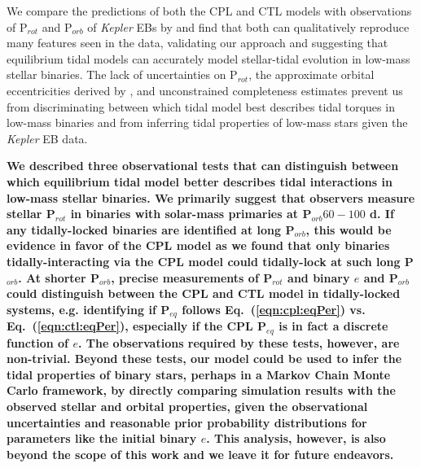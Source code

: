 \documentclass[twocolumn]{aastex61}
\newcommand{\xxx}[1]{{\textbf{#1}}}
\newcommand{\kepler}[0]{\textit{Kepler}\xspace}
\begin{document}
We compare the predictions of both the CPL and CTL models with observations of P$_{rot}$ and P$_{orb}$ of \kepler EBs by \citet{Lurie2017} and find that both can qualitatively reproduce many features seen in the data, validating our approach and suggesting that equilibrium tidal models can accurately model stellar-tidal evolution in low-mass stellar binaries. The lack of uncertainties on P$_{rot}$, the approximate orbital eccentricities derived by \citet{Lurie2017}, and unconstrained completeness estimates prevent us from discriminating between which tidal model best describes tidal torques in low-mass binaries and from inferring tidal properties of low-mass stars given the \kepler EB data.  

\xxx{We described three observational tests that can distinguish between which equilibrium tidal model better describes tidal interactions in low-mass stellar binaries. We primarily suggest that observers measure stellar P$_{rot}$ in binaries with solar-mass primaries at P$_{orb} 60-100$ d. If any tidally-locked binaries are identified at long P$_{orb}$, this would be evidence in favor of the CPL model as we found that only binaries tidally-interacting via the CPL model could tidally-lock at such long P$_{orb}$. At shorter P$_{orb}$, precise measurements of P$_{rot}$ and binary $e$ and P$_{orb}$ could distinguish between the CPL and CTL model in tidally-locked systems, e.g. identifying if P$_{eq}$ follows Eq.~(\ref{eqn:cpl:eqPer}) vs. Eq.~(\ref{eqn:ctl:eqPer}), especially if the CPL P$_{eq}$ is in fact a discrete function of $e$. The observations required by these tests, however, are non-trivial. Beyond these tests, our model could be used to infer the tidal properties of binary stars, perhaps in a Markov Chain Monte Carlo framework, by directly comparing simulation results with the observed stellar and orbital properties, given the observational uncertainties and reasonable prior probability distributions for parameters like the initial binary $e$. This analysis, however, is also beyond the scope of this work and we leave it for future endeavors.}
\end{document}
